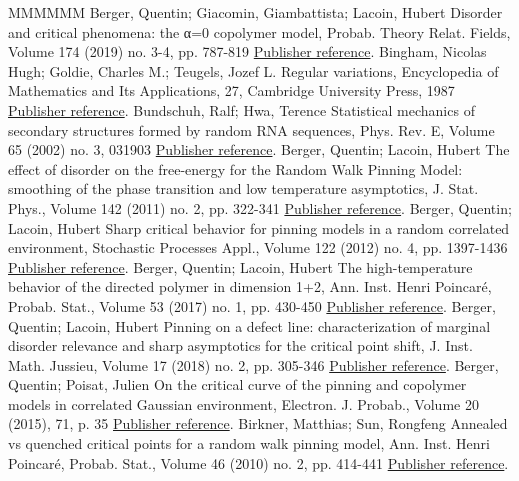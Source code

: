 \documentclass[11pt]{article}
\theoremstyle{definition}
\numberwithin{equation}{section}
\numberwithin{figure}{section}
\numberwithin{table}{section}
\begin{document}
\begin{thebibliography}{MMMMMM}
 Berger, Quentin; Giacomin, Giambattista; Lacoin, Hubert Disorder and critical phenomena: the α=0 copolymer model, Probab. Theory Relat. Fields, Volume 174 (2019) no. 3-4, pp. 787-819 \href{https://ahl.centre-mersenne.org/item/AHL_2020__3__299_0/#cf:BGL}{Publisher reference}.
 Bingham, Nicolas Hugh; Goldie, Charles M.; Teugels, Jozef L. Regular variations, Encyclopedia of Mathematics and Its Applications, 27, Cambridge University Press, 1987 \href{https://ahl.centre-mersenne.org/item/AHL_2020__3__299_0/#cf:BGT}{Publisher reference}.
 Bundschuh, Ralf; Hwa, Terence Statistical mechanics of secondary structures formed by random RNA sequences, Phys. Rev. E, Volume 65 (2002) no. 3, 031903 \href{https://ahl.centre-mersenne.org/item/AHL_2020__3__299_0/#cf:BundHwa}{Publisher reference}.
 Berger, Quentin; Lacoin, Hubert The effect of disorder on the free-energy for the Random Walk Pinning Model: smoothing of the phase transition and low temperature asymptotics, J. Stat. Phys., Volume 142 (2011) no. 2, pp. 322-341 \href{https://ahl.centre-mersenne.org/item/AHL_2020__3__299_0/#cf:BL11}{Publisher reference}.
 Berger, Quentin; Lacoin, Hubert Sharp critical behavior for pinning models in a random correlated environment, Stochastic Processes Appl., Volume 122 (2012) no. 4, pp. 1397-1436 \href{https://ahl.centre-mersenne.org/item/AHL_2020__3__299_0/#cf:BL12}{Publisher reference}.
 Berger, Quentin; Lacoin, Hubert The high-temperature behavior of the directed polymer in dimension 1+2, Ann. Inst. Henri Poincaré, Probab. Stat., Volume 53 (2017) no. 1, pp. 430-450 \href{https://ahl.centre-mersenne.org/item/AHL_2020__3__299_0/#cf:BL16bis}{Publisher reference}.
 Berger, Quentin; Lacoin, Hubert Pinning on a defect line: characterization of marginal disorder relevance and sharp asymptotics for the critical point shift, J. Inst. Math. Jussieu, Volume 17 (2018) no. 2, pp. 305-346 \href{https://ahl.centre-mersenne.org/item/AHL_2020__3__299_0/#cf:BL16}{Publisher reference}.
 Berger, Quentin; Poisat, Julien On the critical curve of the pinning and copolymer models in correlated Gaussian environment, Electron. J. Probab., Volume 20 (2015), 71, p. 35 \href{https://ahl.centre-mersenne.org/item/AHL_2020__3__299_0/#cf:BP15}{Publisher reference}.
 Birkner, Matthias; Sun, Rongfeng Annealed vs quenched critical points for a random walk pinning model, Ann. Inst. Henri Poincaré, Probab. Stat., Volume 46 (2010) no. 2, pp. 414-441 \href{https://ahl.centre-mersenne.org/item/AHL_2020__3__299_0/#cf:BS1}{Publisher reference}.

\end{thebibliography}
\end{document}
